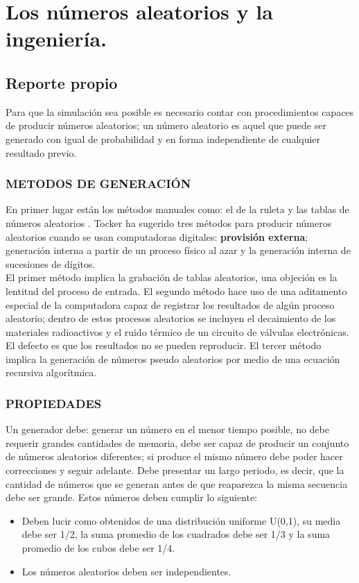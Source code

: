 \section*{Los números aleatorios y la ingeniería.}
\subsection*{Reporte propio}
	\noindent Para que la simulación sea posible es necesario contar con procedimientos capaces de producir números aleatorios; un número aleatorio es aquel que puede ser generado con igual de probabilidad y en forma  independiente de cualquier resultado previo.
	
	\subsubsection*{METODOS DE GENERACIÓN}
	\noindent En primer lugar están los métodos manuales como: el de la ruleta y las tablas de números aleatorios . Tocker ha sugerido tres métodos para producir números aleatorios cuando se usan computadoras digitales: \textbf{provisión externa}; generación interna a partir de un proceso físico al azar y la generación interna de sucesiones de dígitos.\\ 
	El primer método implica la grabación de tablas aleatorios, una objeción es la lentitud del proceso de entrada. El segundo método hace uso de una aditamento especial de la computadora capaz de registrar los resultados de algún proceso aleatorio; dentro de estos procesos aleatorios se incluyen el decaimiento de los materiales radioactivos y el ruido térmico de un circuito de válvulas electrónicas. El defecto es que los resultados no se pueden reproducir. El tercer método implica la generación de números pseudo aleatorios por medio de una ecuación recursiva algorítmica.
	
	 \subsubsection*{PROPIEDADES}
	 \noindent Un generador debe: generar un número en el menor tiempo posible, no debe requerir grandes cantidades de memoria, debe ser capaz de producir un conjunto de números aleatorios diferentes; si produce el mismo número debe poder hacer correcciones y seguir adelante. Debe presentar un largo periodo, es decir, que la cantidad de números que se generan antes de que reaparezca la misma secuencia debe ser grande. Estos números deben cumplir lo siguiente:
	 \begin{itemize}
	 	\item Deben lucir como obtenidos de una distribución uniforme U(0,1), su media debe ser 1/2, la suma promedio de los cuadrados debe ser 1/3 y la suma promedio de los cubos debe ser 1/4.
	 	\item Los números aleatorios deben ser independientes.
	 \end{itemize} 
	 
